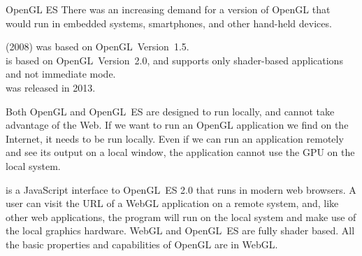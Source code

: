 \documentclass[\main/notes.tex]{subfiles}
\begin{document}
			\begin{definition}{OpenGL ES}
				There was an increasing demand for a version of OpenGL
				that would run in embedded systems, smartphones,
				and other hand-held devices.

				 (2008) was based on OpenGL~Version~1.5.\\
				 is based on OpenGL~Version~2.0,
				and supports only shader-based applications and not immediate mode.\\
				 was released in 2013.
			\end{definition}

			Both OpenGL and OpenGL~ES are designed to run locally,
			and cannot take advantage of the Web.
			If we want to run an OpenGL application we find on the Internet,
			it needs to be run locally.
			Even if we can run an application remotely and see its output on a local window,
			the application cannot use the GPU on the local system.

			 is a JavaScript interface to OpenGL~ES 2.0
			that runs in modern web browsers.
			A user can visit the URL of a WebGL application on a remote system,
			and, like other web applications,
			the program will run on the local system and make use of the local graphics hardware.
			WebGL and OpenGL~ES are fully shader based.
			All the basic properties and capabilities of OpenGL are in WebGL.

\end{document}
